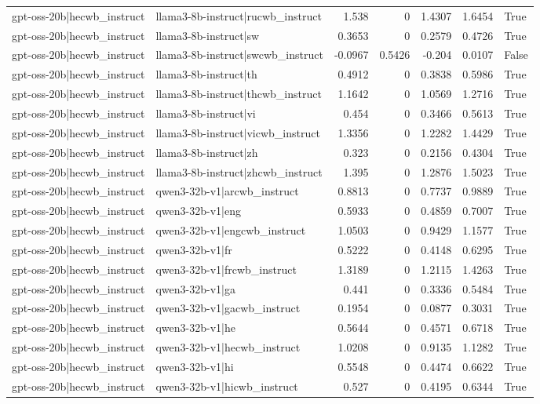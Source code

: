 \begin{table}
\begin{tabular}{l l r r r r l}
gpt-oss-20b|hecwb_instruct & llama3-8b-instruct|rucwb_instruct & 1.538 & 0 & 1.4307 & 1.6454 & True \\
gpt-oss-20b|hecwb_instruct & llama3-8b-instruct|sw & 0.3653 & 0 & 0.2579 & 0.4726 & True \\
gpt-oss-20b|hecwb_instruct & llama3-8b-instruct|swcwb_instruct & -0.0967 & 0.5426 & -0.204 & 0.0107 & False \\
gpt-oss-20b|hecwb_instruct & llama3-8b-instruct|th & 0.4912 & 0 & 0.3838 & 0.5986 & True \\
gpt-oss-20b|hecwb_instruct & llama3-8b-instruct|thcwb_instruct & 1.1642 & 0 & 1.0569 & 1.2716 & True \\
gpt-oss-20b|hecwb_instruct & llama3-8b-instruct|vi & 0.454 & 0 & 0.3466 & 0.5613 & True \\
gpt-oss-20b|hecwb_instruct & llama3-8b-instruct|vicwb_instruct & 1.3356 & 0 & 1.2282 & 1.4429 & True \\
gpt-oss-20b|hecwb_instruct & llama3-8b-instruct|zh & 0.323 & 0 & 0.2156 & 0.4304 & True \\
gpt-oss-20b|hecwb_instruct & llama3-8b-instruct|zhcwb_instruct & 1.395 & 0 & 1.2876 & 1.5023 & True \\
gpt-oss-20b|hecwb_instruct & qwen3-32b-v1|arcwb_instruct & 0.8813 & 0 & 0.7737 & 0.9889 & True \\
gpt-oss-20b|hecwb_instruct & qwen3-32b-v1|eng & 0.5933 & 0 & 0.4859 & 0.7007 & True \\
gpt-oss-20b|hecwb_instruct & qwen3-32b-v1|engcwb_instruct & 1.0503 & 0 & 0.9429 & 1.1577 & True \\
gpt-oss-20b|hecwb_instruct & qwen3-32b-v1|fr & 0.5222 & 0 & 0.4148 & 0.6295 & True \\
gpt-oss-20b|hecwb_instruct & qwen3-32b-v1|frcwb_instruct & 1.3189 & 0 & 1.2115 & 1.4263 & True \\
gpt-oss-20b|hecwb_instruct & qwen3-32b-v1|ga & 0.441 & 0 & 0.3336 & 0.5484 & True \\
gpt-oss-20b|hecwb_instruct & qwen3-32b-v1|gacwb_instruct & 0.1954 & 0 & 0.0877 & 0.3031 & True \\
gpt-oss-20b|hecwb_instruct & qwen3-32b-v1|he & 0.5644 & 0 & 0.4571 & 0.6718 & True \\
gpt-oss-20b|hecwb_instruct & qwen3-32b-v1|hecwb_instruct & 1.0208 & 0 & 0.9135 & 1.1282 & True \\
gpt-oss-20b|hecwb_instruct & qwen3-32b-v1|hi & 0.5548 & 0 & 0.4474 & 0.6622 & True \\
gpt-oss-20b|hecwb_instruct & qwen3-32b-v1|hicwb_instruct & 0.527 & 0 & 0.4195 & 0.6344 & True \\

\end{tabular}
\end{table}
